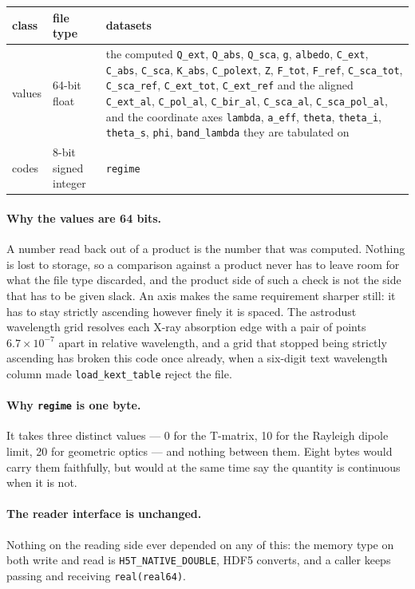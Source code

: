 \documentclass{my_memo}
\newcommand{\code}[1]{\texttt{#1}}
\begin{document}
\begin{center}
\begin{tabular}{@{}llp{}@{}}
\toprule
class & file type & datasets \\
\midrule
values & 64-bit float & the computed \code{Q\_ext}, \code{Q\_abs}, \code{Q\_sca},
   \code{g}, \code{albedo}, \code{C\_ext}, \code{C\_abs}, \code{C\_sca},
   \code{K\_abs}, \code{C\_polext}, \code{Z}, \code{F\_tot}, \code{F\_ref},
   \code{C\_sca\_tot}, \code{C\_sca\_ref}, \code{C\_ext\_tot},
   \code{C\_ext\_ref} and the aligned \code{C\_ext\_al}, \code{C\_pol\_al},
   \code{C\_bir\_al}, \code{C\_sca\_al}, \code{C\_sca\_pol\_al}, and the
   coordinate axes \code{lambda}, \code{a\_eff}, \code{theta},
   \code{theta\_i}, \code{theta\_s}, \code{phi}, \code{band\_lambda} they are
   tabulated on \\[2pt]
codes  & 8-bit signed integer & \code{regime} \\
\bottomrule
\end{tabular}
\end{center}

\paragraph{Why the values are 64 bits.} A number read back out of a product is
the number that was computed. Nothing is lost to storage, so a comparison
against a product never has to leave room for what the file type discarded, and
the product side of such a check is not the side that has to be given slack. An
axis makes the same requirement sharper still: it has to stay strictly ascending
however finely it is spaced. The astrodust wavelength grid resolves each X-ray
absorption edge with a pair of points $6.7\times10^{-7}$ apart in relative
wavelength, and a grid that stopped being strictly ascending has broken this
code once already, when a six-digit text wavelength column made
\code{load\_kext\_table} reject the file.

\paragraph{Why \code{regime} is one byte.} It takes three distinct values ---
0 for the T-matrix, 10 for the Rayleigh dipole limit, 20 for geometric optics
--- and nothing between them. Eight bytes would carry them faithfully, but
would at the same time say the quantity is continuous when it is not.

\paragraph{The reader interface is unchanged.} Nothing on the reading side ever
depended on any of this: the memory type on both write and read is
\code{H5T\_NATIVE\_DOUBLE}, HDF5 converts, and a caller keeps passing and
receiving \code{real(real64)}.
\end{document}
